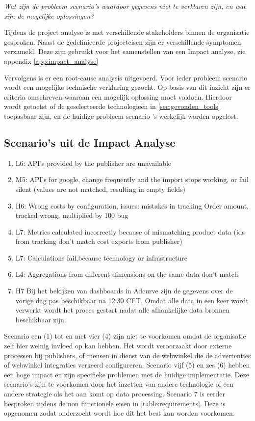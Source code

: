 \textit{Wat zijn de probleem scenario's waardoor gegevens niet te verklaren zijn, en wat zijn de mogelijke oplossingen?}

Tijdens de project analyse is met verschillende stakeholders binnen de organisatie gesproken. Naast de gedefinieerde projecteisen zijn er verschillende symptomen verzameld. Deze zijn gebruikt voor het samenstellen van een Impact analyse, zie appendix \ref{app:impact_analyse}

Vervolgens is er een root-cause analysis uitgevoerd. Voor ieder probleem scenario wordt een mogelijke technische verklaring gezocht. Op basis van dit inzicht zijn er criteria omschreven waaraan een mogelijk oplossing moet voldoen. Hierdoor wordt getoetst of de geselecteerde technologieën in \ref{sec:gevonden_tools} toepasbaar zijn, en de huidige probleem scenario 's werkelijk worden opgelost.

\subsection{Scenario's uit de Impact Analyse}

\begin{enumerate}
    \item L6: API's provided by the publisher are unavailable
    \item M5: API's for google, change frequently and the import stops working, or fail silent (values are not matched, resulting in empty fields)
    \item H6: Wrong costs by configuration, issues: mistakes in tracking Order amount, tracked wrong, multiplied by 100 bug
    \item L7: Metrics calculated incorrectly because of mismatching product data (ids from tracking don't match cost exports from publisher)
    \item L7: Calculations fail,because technology or infrastructure 
    \item L4: Aggregations from different dimensions on the same data
    don't match
    \item H7 Bij het bekijken van dashboards in Adcurve zijn de gegevens over de vorige dag pas beschikbaar na 12:30 CET. Omdat alle data in een keer wordt verwerkt wordt het proces gestart nadat alle afhankelijke data bronnen beschikbaar zijn.
\end{enumerate}

Scenario een (1) tot en met vier (4) zijn niet te voorkomen omdat de organisatie zelf hier weinig invloed op kan hebben. Het wordt veroorzaakt door externe processen bij publishers, of mensen in dienst van de webwinkel die de advertenties of webwinkel integraties verkeerd configureren. Scenario vijf (5) en zes (6) hebben een hoge impact en zijn specifieke problemen met de huidige implementatie. Deze scenario's zijn te voorkomen door het inzetten van andere technologie of een andere strategie als het aan komt op data processing.
Scenario 7 is eerder besproken tijdens de non functionele eisen in \ref{table:requirements}. Deze is opgenomen zodat onderzocht wordt hoe dit het best kan worden voorkomen.  

